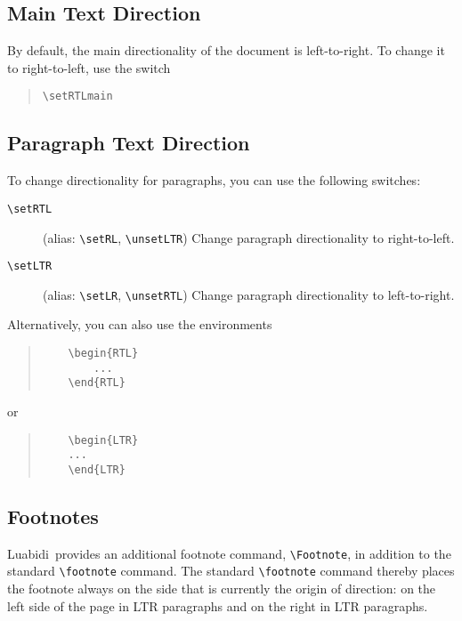 \documentclass{article}
\newcommand*\Lbd{\textsf{Luabidi}}
\newcommand*{\cmd}[1]{\texttt{\textbackslash #1}}
\begin{document}
\subsection{Main Text Direction}

By default, the main directionality of the document is left-to-right. To change it to right-to-left, use the switch

\begin{quote}
	\cmd{setRTLmain}
\end{quote}

\subsection{Paragraph Text Direction}

To change directionality for paragraphs, you can use the following switches:
\begin{description}
	\item[\cmd{setRTL}] (alias: \cmd{setRL}, \cmd{unsetLTR}) Change paragraph directionality to right-to-left.
	\item[\cmd{setLTR}] (alias: \cmd{setLR}, \cmd{unsetRTL}) Change paragraph directionality to left-to-right.
\end{description}
%
Alternatively, you can also use the environments

\begin{quote}
	\begin{verbatim}
	\begin{RTL}
		...
	\end{RTL}
	\end{verbatim}
\end{quote}
%
or

\begin{quote}
	\begin{verbatim}
	\begin{LTR}
	...
	\end{LTR}
	\end{verbatim}
\end{quote}
 
\subsection{Footnotes}

\Lbd\ provides an additional footnote command, \cmd{Footnote}, in addition to the standard \cmd{footnote} command.
The standard
\cmd{footnote} command thereby places the footnote always on the side that is currently the origin of direction:
on the left side of the page in LTR paragraphs and on the right in LTR paragraphs.
\end{document}

